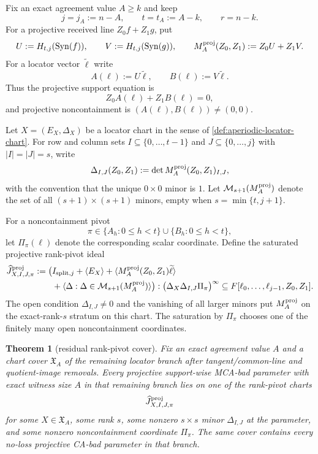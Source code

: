 \documentclass[11pt]{article}
\newtheorem{theorem}{Theorem}[section]
\theoremstyle{definition}
\theoremstyle{remark}
\newcommand{\Syn}{\operatorname{Syn}}
\begin{document}
Fix an exact agreement value $A\ge k$ and keep
\[
        j=j_A:=n-A,
        \qquad
        t=t_A:=A-k,
        \qquad
        r=n-k .
\]
For a projective received line $Z_0 f+Z_1 g$, put
\[
        U:=H_{t,j}(\Syn(f)),
        \qquad
        V:=H_{t,j}(\Syn(g)),
        \qquad
        M^{\rm proj}_A(Z_0,Z_1):=Z_0U+Z_1V .
\]
For a locator vector $\widetilde\ell$ write
\[
        A(\ell):=U\widetilde\ell,
        \qquad
        B(\ell):=V\widetilde\ell .
\]
Thus the projective support equation is
\[
        Z_0A(\ell)+Z_1B(\ell)=0,
\]
and projective noncontainment is $(A(\ell),B(\ell))\ne(0,0)$.

Let $X=(E_X,\Delta_X)$ be a locator chart in the sense of
\cref{def:aperiodic-locator-chart}.  For row and column sets
$I\subseteq\{0,\ldots,t-1\}$ and
$J\subseteq\{0,\ldots,j\}$ with $|I|=|J|=s$, write
\[
        \Delta_{I,J}(Z_0,Z_1):=
        \det M^{\rm proj}_A(Z_0,Z_1)_{I,J},
\]
with the convention that the unique $0\times0$ minor is $1$.  Let
$\mathcal M_{s+1}(M^{\rm proj}_A)$ denote the set of all $(s+1)\times(s+1)$
minors, empty when $s=\min\{t,j+1\}$.

For a noncontainment pivot
\[
        \pi\in\{A_h:0\le h<t\}\cup\{B_h:0\le h<t\},
\]
let $\Pi_\pi(\ell)$ denote the corresponding scalar coordinate.  Define the
saturated projective rank-pivot ideal
\[
\begin{aligned}
        \widehat J^{\rm proj}_{X,I,J,\pi}:=
        \bigl(&I_{{\rm split},j}+\langle E_X\rangle
        +\langle M^{\rm proj}_A(Z_0,Z_1)\widetilde\ell\rangle\\
        &+\langle \Delta: \Delta\in\mathcal M_{s+1}(M^{\rm proj}_A)\rangle
        \bigr):
        \bigl(\Delta_X\Delta_{I,J}\Pi_\pi\bigr)^\infty
        \subseteq F[\ell_0,\ldots,\ell_{j-1},Z_0,Z_1].
\end{aligned}
\]
The open condition $\Delta_{I,J}\ne0$ and the vanishing of all larger minors put
$M^{\rm proj}_A$ on the exact-rank-$s$ stratum on this chart.  The saturation by
$\Pi_\pi$ chooses one of the finitely many open noncontainment coordinates.

\begin{theorem}[residual rank-pivot cover]
\label{thm:residual-rank-pivot-cover}
Fix an exact agreement value $A$ and a chart cover $\mathfrak X_A$ of the
remaining locator branch after tangent/common-line and quotient-image removals.
Every projective support-wise MCA-bad parameter with exact witness size $A$ in
that remaining branch lies on one of the rank-pivot charts
\[
        \widehat J^{\rm proj}_{X,I,J,\pi}
\]
for some $X\in\mathfrak X_A$, some rank $s$, some nonzero $s\times s$ minor
$\Delta_{I,J}$ at the parameter, and some nonzero noncontainment coordinate
$\Pi_\pi$.  The same cover contains every no-loss projective CA-bad parameter in
that branch.
\end{theorem}
\end{document}
